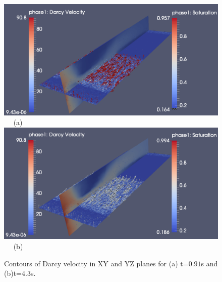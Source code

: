 \begin{landscape}
\begin{figure}[ht] 
\vbox{
\hbox{\hspace{3.5cm}
\includegraphics[width=1.0\textwidth]{./Pics1/3D_Channel/3D_channel_darcy_vel_planes_100.pdf} 
}
\vspace{0.0cm}
\hbox{\hspace{10.0cm} (a)     
}
\hbox{\hspace{3.5cm}
\includegraphics[width=1.0\textwidth]{./Pics1/3D_Channel/3D_channel_darcy_vel_planes_490.pdf}
}
\vspace{0.0cm}
\hbox{\hspace{10.cm} (b)      
}
}     
\caption{Contours of Darcy velocity in XY and YZ planes for (a) t=$0.91$s and (b)t=$4.3$s.}
\label{fig:3DChannel_darcy_vel}
\end{figure}
\end{landscape}
\clearpage

